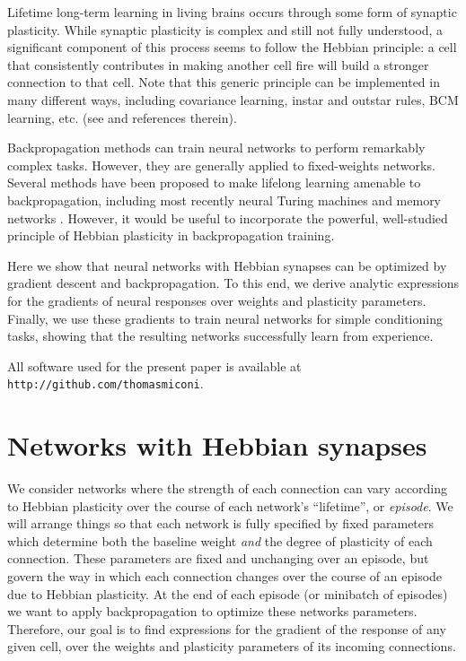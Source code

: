 \documentclass{article}
\begin{document}
Lifetime long-term learning in living brains occurs through some
form of synaptic plasticity. While synaptic plasticity is complex and still not
fully understood, a significant component of this process seems to follow the Hebbian principle: a
cell that consistently contributes in making another cell fire will build a
stronger connection to that cell. Note that this generic principle can be
implemented in many different ways, including covariance learning, instar and
outstar rules, BCM learning, etc. (see \cite{Vasilkoski2011-ww} and references therein). 

Backpropagation methods can train neural networks to perform remarkably complex
tasks. However, they are generally applied to fixed-weights networks. Several
methods have been proposed to make lifelong learning amenable to
backpropagation, including most recently neural Turing machines
\cite{Graves2014-ch,Santoro2016-jn} and
memory networks \cite{Sukhbaatar2015-ly}. However, it would be useful to incorporate the powerful, well-studied
principle of Hebbian plasticity in backpropagation
training.

Here we show that neural networks with Hebbian synapses can be optimized by
gradient descent and backpropagation. To this end, we derive analytic
expressions for the gradients of neural responses
over weights and plasticity parameters. Finally, we use these gradients to train neural
networks for simple conditioning tasks, showing that the resulting networks
successfully learn from experience.

All software used for the present paper is available at
\texttt{http://github.com/thomasmiconi}.

\section{Networks with Hebbian synapses}

We consider networks where the strength of each connection can vary according to
Hebbian plasticity over the course of each network's ``lifetime'', or
\emph{episode}. We will arrange things so that each network is fully specified
by fixed parameters which determine both the baseline weight \emph{and} the degree of plasticity of each connection.
These parameters are fixed and unchanging over an episode, but govern the way in which
each connection changes over the course of an episode due to Hebbian plasticity. At the end of each
episode (or minibatch of episodes) we want to apply backpropagation to optimize
these networks parameters. Therefore, our goal is to find expressions for the gradient of the response of any
given cell, over the weights and plasticity parameters of its incoming connections.
\end{document}
